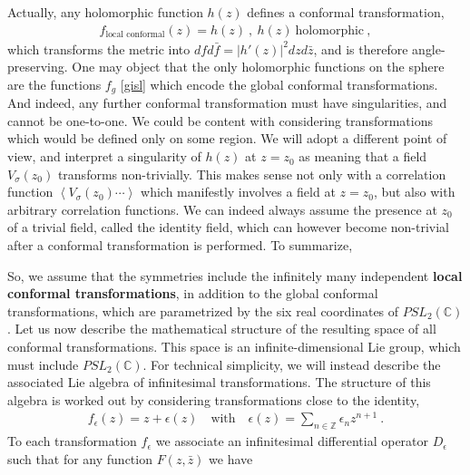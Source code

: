 \documentclass[12pt,a4paper,notitlepage]{report}
\numberwithin{equation}{section}
\theoremstyle{break}
\begin{document}
Actually, any holomorphic function $h(z)$ defines a conformal transformation,
\begin{align}
 f_\text{local conformal}(z) = h(z) \ , \ h(z)\ \text{holomorphic}\ , 
\label{flc}
\end{align}
which transforms the metric into $dfd\bar{f} = |h'(z)|^2 dzd\bar{z}$, and is therefore angle-preserving.
One may object that the only holomorphic functions on the sphere are the functions $f_g$ \eqref{gisl} which encode the global conformal transformations.
And indeed, any further conformal transformation must have singularities, and cannot be one-to-one.
We could be content with considering transformations which would be defined only on some region.
We will adopt a different point of view, and interpret a singularity of $h(z)$ at $z=z_0$ as meaning that a field $V_\sigma(z_0)$ transforms non-trivially.
This makes sense not only with a correlation function $\left\langle V_{\sigma}(z_0)\cdots \right\rangle $ which manifestly involves a field at $z=z_0$, 
but also with arbitrary correlation functions.
We can indeed always assume the presence at $z_0$ of a trivial field, called the identity field, which can however become non-trivial after a conformal transformation is performed.
To summarize,
\begin{center}
\end{center}
So, we assume that the symmetries include the infinitely many independent \textbf{\boldmath local conformal transformations}, in addition to the global conformal transformations, which are parametrized by the six real coordinates of $PSL_2({\mathbb{C}})$.
Let us now describe the mathematical structure of the resulting space of all conformal transformations.
This space is an infinite-dimensional Lie group, which must include $PSL_2({\mathbb{C}})$.
For technical simplicity, we will instead describe the associated Lie algebra of infinitesimal transformations.
The structure of this algebra is worked out by considering transformations close to the identity, 
\begin{align}
 f_{\epsilon}(z) = z + \epsilon(z) \quad \text{with} \quad \epsilon(z) = \sum_{n\in{\mathbb{Z}}} \epsilon_n z^{n+1}\ .
\label{sen}
\end{align}
To each transformation $f_\epsilon$ we associate an infinitesimal differential operator $D_\epsilon$ such that for any function $F(z,\bar{z})$ we have 
\end{document}

